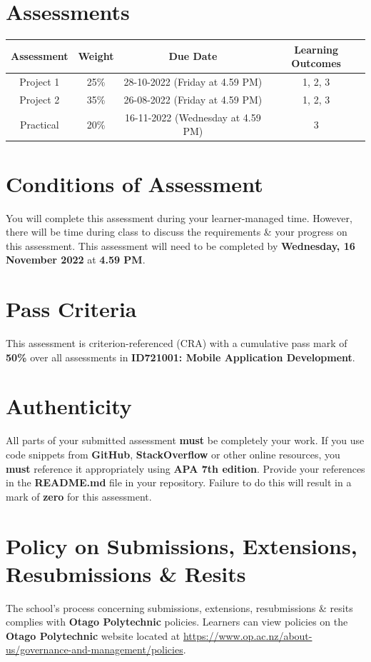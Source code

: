 \documentclass{article}
\begin{document}
\section*{Assessments}
\renewcommand{\arraystretch}{1.5}
\begin{tabular}{|c|c|c|c|}
	\hline
	\textbf{Assessment} & \textbf{Weight} & \textbf{Due Date}    & \textbf{Learning Outcomes} \\ \hline
	Project 1            & 25\%            & 28-10-2022 (Friday at 4.59 PM)  & 1, 2, 3                    \\ \hline
	Project 2         & 35\%            & 26-08-2022 (Friday at 4.59 PM) & 1, 2, 3                    \\ \hline
	Practical       & 20\%            & 16-11-2022 (Wednesday at 4.59 PM) & 3                       \\ \hline
\end{tabular}

\section*{Conditions of Assessment}
You will complete this assessment during your learner-managed time. However, there will be time during class to discuss the requirements \& your progress on this assessment. This assessment will need to be completed by \textbf{Wednesday, 16 November 2022} at \textbf{4.59 PM}.

\section*{Pass Criteria}
This assessment is criterion-referenced (CRA) with a cumulative pass mark of \textbf{50\%} over all assessments in \textbf{ID721001: Mobile Application Development}.

\section*{Authenticity}
All parts of your submitted assessment \textbf{must} be completely your work. If you use code snippets from \textbf{GitHub}, \textbf{StackOverflow} or other online resources, you \textbf{must} reference it appropriately using \textbf{APA 7th edition}. Provide your references in the \textbf{README.md} file in your repository. Failure to do this will result in a mark of \textbf{zero} for this assessment.

\section*{Policy on Submissions, Extensions, Resubmissions \& Resits}
The school's process concerning submissions, extensions, resubmissions \& resits complies with \textbf{Otago Polytechnic} policies. Learners can view policies on the \textbf{Otago Polytechnic} website located at \href{https://www.op.ac.nz/about-us/governance-and-management/policies}{https://www.op.ac.nz/about-us/governance-and-management/policies}.
\end{document}
